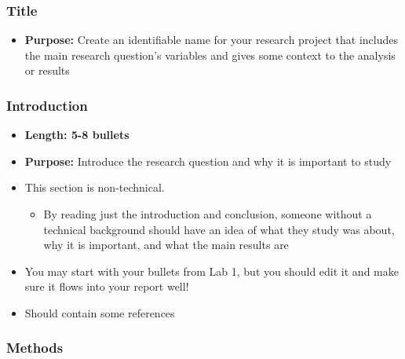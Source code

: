 \documentclass[
  letterpaper,
  DIV=11,
  numbers=noendperiod]{scrartcl}
\providecommand{\tightlist}{%
  \setlength{\itemsep}{0pt}\setlength{\parskip}{0pt}}\usepackage{longtable,booktabs,array}
\begin{document}
\subsubsection{Title}\label{title}

\begin{itemize}
\tightlist
\item
  \textbf{Purpose:} Create an identifiable name for your research
  project that includes the main research question's variables and gives
  some context to the analysis or results
\end{itemize}

\subsubsection{Introduction}\label{introduction}

\begin{itemize}
\tightlist
\item
  \textbf{Length: 5-8 bullets}
\item
  \textbf{Purpose:} Introduce the research question and why it is
  important to study
\item
  This section is non-technical.

  \begin{itemize}
  \tightlist
  \item
    By reading just the introduction and conclusion, someone without a
    technical background should have an idea of what they study was
    about, why it is important, and what the main results are
  \end{itemize}
\item
  You may start with your bullets from Lab 1, but you should edit it and
  make sure it flows into your report well!
\item
  Should contain some references
\end{itemize}

\subsubsection{Methods}\label{methods}
\end{document}
